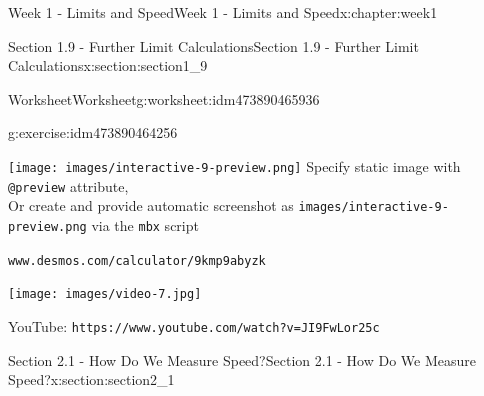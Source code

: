 \documentclass[oneside,10pt,]{book}
\newcommand{\mono}[1]{\texttt{#1}}
\numberwithin{equation}{section}
\newlength{\qrsize}
\newlength{\previewwidth}
\begin{document}
\begin{chapterptx}{Week 1 - Limits and Speed}{}{Week 1 - Limits and Speed}{}{}{x:chapter:week1}
\begin{sectionptx}{Section 1.9 - Further Limit Calculations}{}{Section 1.9 - Further Limit Calculations}{}{}{x:section:section1_9}
\begin{worksheet-subsection}{Worksheet}{}{Worksheet}{}{}{g:worksheet:idm473890465936}
\begin{divisionexercise}{2}{}{}{g:exercise:idm473890464256}
\par
\setlength{\qrsize}{9em}
\setlength{\previewwidth}{\linewidth}
\addtolength{\previewwidth}{-\qrsize}
\begin{tcbraster}[raster columns=2, raster column skip=1pt, raster halign=center, raster force size=false, raster left skip=0pt, raster right skip=0pt]%
\begin{tcolorbox}[previewstyle, width=\previewwidth]%
%
{\texttt{[image: images/interactive-9-preview.png]}}%
{\small{}Specify static image with \mono{@preview} attribute,\\Or create and provide automatic screenshot as \mono{images/interactive-9-preview.png} via the \mono{mbx} script}%
\end{tcolorbox}%
\begin{tcolorbox}[qrstyle]%
{\hypersetup{urlcolor=black}}%
\end{tcolorbox}%
\begin{tcolorbox}[captionstyle]%
\small \mono{www.desmos.com/calculator/9kmp9abyzk}\end{tcolorbox}%
\end{tcbraster}%
%
\end{divisionexercise}%
\end{worksheet-subsection}
\restoregeometry
\setlength{\qrsize}{9em}
\setlength{\previewwidth}{\linewidth}
\addtolength{\previewwidth}{-\qrsize}
\begin{tcbraster}[raster columns=2, raster column skip=1pt, raster halign=center, raster force size=false, raster left skip=0pt, raster right skip=0pt]%
\begin{tcolorbox}[previewstyle, width=\previewwidth]%
\texttt{[image: images/video-7.jpg]}%
\end{tcolorbox}%
\begin{tcolorbox}[qrstyle]%
{\hypersetup{urlcolor=black}}%
\end{tcolorbox}%
\begin{tcolorbox}[captionstyle]%
\small YouTube: \mono{https://www.youtube.com/watch?v=JI9FwLor25c}\end{tcolorbox}%
\end{tcbraster}%
\end{sectionptx}
%
%
\typeout{************************************************}
\typeout{************************************************}
%
\begin{sectionptx}{Section 2.1 - How Do We Measure Speed?}{}{Section 2.1 - How Do We Measure Speed?}{}{}{x:section:section2_1}

\end{sectionptx}
\end{chapterptx}
\end{document}
